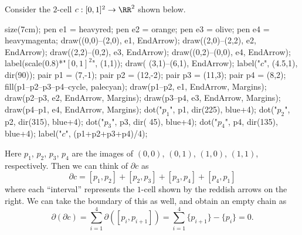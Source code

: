 \documentclass[11pt]{scrreprt}
\begin{document}
\begin{example}
	Consider the $2$-cell $c : [0,1]^2 \to \RR^2$ shown below.
	\begin{center}
		\begin{asy}
			size(7cm);
			pen e1 = heavyred;
			pen e2 = orange;
			pen e3 = olive;
			pen e4 = heavymagenta;
			draw((0,0)--(2,0), e1, EndArrow);
			draw((2,0)--(2,2), e2, EndArrow);
			draw((2,2)--(0,2), e3, EndArrow);
			draw((0,2)--(0,0), e4, EndArrow);
			label(scale(0.8)*"$[0,1]^2$", (1,1));
			draw( (3,1)--(6,1), EndArrow);
			label("$c$", (4.5,1), dir(90));
			pair p1 = (7,-1);
			pair p2 = (12,-2);
			pair p3 = (11,3);
			pair p4 = (8,2);
			fill(p1--p2--p3--p4--cycle, palecyan);
			draw(p1--p2, e1, EndArrow, Margins);
			draw(p2--p3, e2, EndArrow, Margins);
			draw(p3--p4, e3, EndArrow, Margins);
			draw(p4--p1, e4, EndArrow, Margins);
			dot("$p_1$", p1, dir(225), blue+4);
			dot("$p_2$", p2, dir(315), blue+4);
			dot("$p_3$", p3, dir( 45), blue+4);
			dot("$p_4$", p4, dir(135), blue+4);
			label("$c$", (p1+p2+p3+p4)/4);
		\end{asy}
	\end{center}
	Here $p_1$, $p_2$, $p_3$, $p_4$ are the images of $(0,0)$, $(0,1)$, $(1,0)$, $(1,1)$, respectively.
	Then we can think of $\partial c$ as
	\[ \partial c = [p_1,p_2] + [p_2,p_3] + [p_3,p_4] + [p_4,p_1] \]
where each ``interval'' represents the $1$-cell shown by the reddish arrows on the right.
	We can take the boundary of this as well, and obtain an empty chain as
	\[ \partial(\partial c) = \sum_{i=1}^4 \partial([p_i, p_{i+1}]) = \sum_{i=1}^4 \{p_{i+1}\}-\{p_i\} = 0. \]
\end{example}
\end{document}
